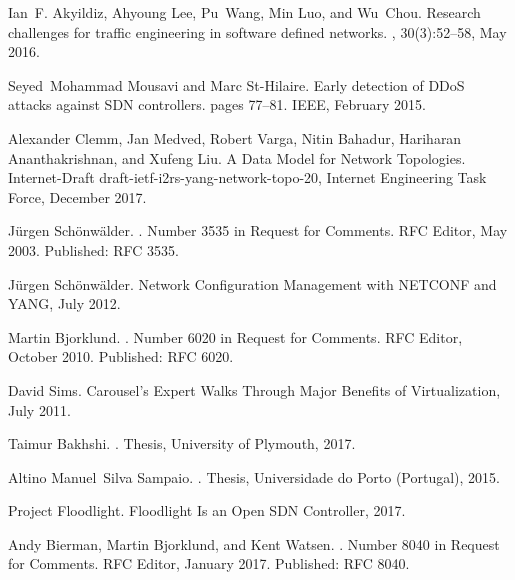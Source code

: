 \begin{thebibliography}{10}
Ian~F. Akyildiz, Ahyoung Lee, Pu~Wang, Min Luo, and Wu~Chou.
\newblock Research challenges for traffic engineering in software defined
  networks.
, 30(3):52--58, May 2016.

Seyed~Mohammad Mousavi and Marc St-Hilaire.
\newblock Early detection of {DDoS} attacks against {SDN} controllers.
\newblock pages 77--81. IEEE, February 2015.

Alexander Clemm, Jan Medved, Robert Varga, Nitin Bahadur, Hariharan
  Ananthakrishnan, and Xufeng Liu.
\newblock A {Data} {Model} for {Network} {Topologies}.
\newblock Internet-{Draft} draft-ietf-i2rs-yang-network-topo-20, Internet
  Engineering Task Force, December 2017.

J{\"u}rgen Sch{\"o}nw{\"a}lder.
.
\newblock Number 3535 in Request for {Comments}. RFC Editor, May 2003.
\newblock Published: RFC 3535.

{J{\"u}rgen Sch{\"o}nw{\"a}lder}.
\newblock Network {Configuration} {Management} with {NETCONF} and {YANG}, July
  2012.

Martin Bjorklund.
.
\newblock Number 6020 in Request for {Comments}. RFC Editor, October 2010.
\newblock Published: RFC 6020.

David Sims.
\newblock Carousel's {Expert} {Walks} {Through} {Major} {Benefits} of
  {Virtualization}, July 2011.

Taimur Bakhshi.
.
 {Thesis}, University of Plymouth, 2017.

Altino Manuel~Silva Sampaio.
.
 {Thesis}, Universidade do Porto (Portugal), 2015.

{Project Floodlight}.
\newblock Floodlight {Is} an {Open} {SDN} {Controller}, 2017.

Andy Bierman, Martin Bjorklund, and Kent Watsen.
.
\newblock Number 8040 in Request for {Comments}. RFC Editor, January 2017.
\newblock Published: RFC 8040.


\end{thebibliography}
